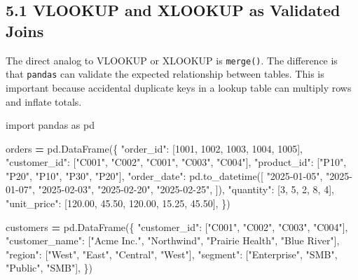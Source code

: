 \documentclass[
  12pt,
]{article}
\newenvironment{Shaded}{\begin{snugshade}}{\end{snugshade}}
\newcommand{\DecValTok}[1]{\textcolor[rgb]{0.00,0.00,0.81}{#1}}
\newcommand{\FloatTok}[1]{\textcolor[rgb]{0.00,0.00,0.81}{#1}}
\newcommand{\ImportTok}[1]{#1}
\newcommand{\NormalTok}[1]{#1}
\newcommand{\OperatorTok}[1]{\textcolor[rgb]{0.81,0.36,0.00}{\textbf{#1}}}
\newcommand{\StringTok}[1]{\textcolor[rgb]{0.31,0.60,0.02}{#1}}
\begin{document}
\subsection{5.1 VLOOKUP and XLOOKUP as Validated
Joins}\label{vlookup-and-xlookup-as-validated-joins}

The direct analog to VLOOKUP or XLOOKUP is \texttt{merge()}. The
difference is that \texttt{pandas} can validate the expected
relationship between tables. This is important because accidental
duplicate keys in a lookup table can multiply rows and inflate totals.

\begin{Shaded}
\begin{Highlighting}[]
\ImportTok{import}\NormalTok{ pandas }\ImportTok{as}\NormalTok{ pd}

\NormalTok{orders }\OperatorTok{=}\NormalTok{ pd.DataFrame(\{}
    \StringTok{"order\_id"}\NormalTok{: [}\DecValTok{1001}\NormalTok{, }\DecValTok{1002}\NormalTok{, }\DecValTok{1003}\NormalTok{, }\DecValTok{1004}\NormalTok{, }\DecValTok{1005}\NormalTok{],}
    \StringTok{"customer\_id"}\NormalTok{: [}\StringTok{"C001"}\NormalTok{, }\StringTok{"C002"}\NormalTok{, }\StringTok{"C001"}\NormalTok{, }\StringTok{"C003"}\NormalTok{, }\StringTok{"C004"}\NormalTok{],}
    \StringTok{"product\_id"}\NormalTok{: [}\StringTok{"P10"}\NormalTok{, }\StringTok{"P20"}\NormalTok{, }\StringTok{"P10"}\NormalTok{, }\StringTok{"P30"}\NormalTok{, }\StringTok{"P20"}\NormalTok{],}
    \StringTok{"order\_date"}\NormalTok{: pd.to\_datetime([}
        \StringTok{"2025{-}01{-}05"}\NormalTok{, }\StringTok{"2025{-}01{-}07"}\NormalTok{, }\StringTok{"2025{-}02{-}03"}\NormalTok{,}
        \StringTok{"2025{-}02{-}20"}\NormalTok{, }\StringTok{"2025{-}02{-}25"}\NormalTok{,}
\NormalTok{    ]),}
    \StringTok{"quantity"}\NormalTok{: [}\DecValTok{3}\NormalTok{, }\DecValTok{5}\NormalTok{, }\DecValTok{2}\NormalTok{, }\DecValTok{8}\NormalTok{, }\DecValTok{4}\NormalTok{],}
    \StringTok{"unit\_price"}\NormalTok{: [}\FloatTok{120.00}\NormalTok{, }\FloatTok{45.50}\NormalTok{, }\FloatTok{120.00}\NormalTok{, }\FloatTok{15.25}\NormalTok{, }\FloatTok{45.50}\NormalTok{],}
\NormalTok{\})}

\NormalTok{customers }\OperatorTok{=}\NormalTok{ pd.DataFrame(\{}
    \StringTok{"customer\_id"}\NormalTok{: [}\StringTok{"C001"}\NormalTok{, }\StringTok{"C002"}\NormalTok{, }\StringTok{"C003"}\NormalTok{, }\StringTok{"C004"}\NormalTok{],}
    \StringTok{"customer\_name"}\NormalTok{: [}\StringTok{"Acme Inc."}\NormalTok{, }\StringTok{"Northwind"}\NormalTok{, }\StringTok{"Prairie Health"}\NormalTok{, }\StringTok{"Blue River"}\NormalTok{],}
    \StringTok{"region"}\NormalTok{: [}\StringTok{"West"}\NormalTok{, }\StringTok{"East"}\NormalTok{, }\StringTok{"Central"}\NormalTok{, }\StringTok{"West"}\NormalTok{],}
    \StringTok{"segment"}\NormalTok{: [}\StringTok{"Enterprise"}\NormalTok{, }\StringTok{"SMB"}\NormalTok{, }\StringTok{"Public"}\NormalTok{, }\StringTok{"SMB"}\NormalTok{],}
\NormalTok{\})}


\end{Highlighting}
\end{Shaded}
\end{document}
